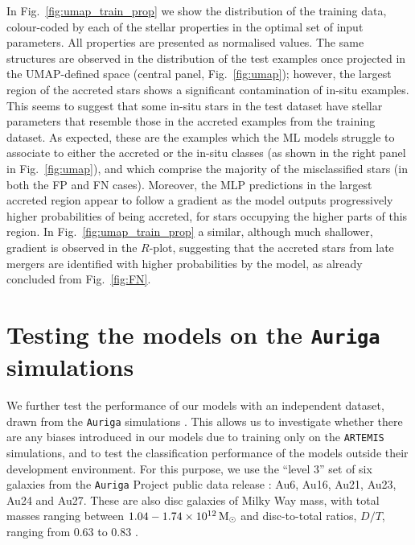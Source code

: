In Fig.~\ref{fig:umap_train_prop} we show the distribution of the training data, colour-coded by each of the stellar properties in the optimal set of input parameters. All properties are presented as normalised values. The same structures are observed in the distribution of the test examples once projected in the UMAP-defined space (central panel, Fig.~\ref{fig:umap}); however, the largest region of the accreted stars shows a significant contamination of in-situ examples. This seems to suggest that some in-situ stars in the test dataset have stellar parameters that resemble those in the accreted examples from the training dataset. As expected, these are the examples which the ML models struggle to associate to either the accreted or the in-situ classes (as shown in the right panel in Fig.~\ref{fig:umap}), and which comprise the majority of the misclassified stars (in both the FP and FN cases). Moreover, the MLP predictions in the largest accreted region appear to follow a gradient as the model outputs progressively higher probabilities of being accreted, for stars occupying the higher parts of this region. In Fig.~\ref{fig:umap_train_prop} a similar, although much shallower, gradient is observed in the $R$-plot, suggesting that the accreted stars from late mergers are identified with higher probabilities by the model, as already concluded from Fig.~\ref{fig:FN}.


\section{Testing the models on the \texttt{Auriga} simulations}
\label{sec:cross_sim}

We further test the performance of our models with an independent dataset, drawn from the \texttt{Auriga} simulations \citep{Grand2017}. This allows us to investigate whether there are any biases introduced in our models due to training only on the \texttt{ARTEMIS} simulations, and to test the classification performance of the models outside their development environment. For this purpose, we use the ``level 3'' set of six  galaxies from the \texttt{Auriga} Project public data release \citep{Grand2024b}: Au6, Au16, Au21, Au23, Au24 and Au27. These are also disc galaxies of Milky Way mass, with total masses ranging between $1.04 - 1.74 \times 10^{12}\, {\rm M}_{\odot}$ and disc-to-total ratios, $D/T$, ranging from 0.63 to 0.83 \citep{Grand2017}.

